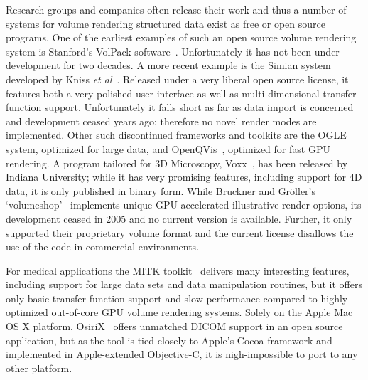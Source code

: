 Research groups and companies often release their work and thus a
number of systems for volume rendering structured data exist as free
or open source programs. One of the earliest examples of such an
open source volume rendering system is Stanford's VolPack
software~\cite{VolPack}.  Unfortunately it has not been under
development for two decades. A more recent example is the Simian system
developed
by Kniss \textit{et al}~\cite{Simian}. Released under a very liberal
open source license, it features both a very polished user interface as
well as multi-dimensional transfer function support. Unfortunately it
falls short as far as data import is concerned and development ceased
years ago; therefore no novel render modes are implemented. Other such
discontinued frameworks and toolkits are the OGLE~\cite{OGLE} system,
optimized for large data, and OpenQVis~\cite{OpenQVis}, optimized for fast GPU
rendering. A program tailored for 3D Microscopy,
Voxx~\cite{Indiana:2009:Voxx}, has been released by Indiana University;
while it has very promising features, including support for 4D data,
it is only published in binary form.  While Bruckner and Gr\"oller's
`volumeshop'~\cite{Bruckner:2005:VolumeShop} implements unique GPU
accelerated illustrative render options, its development ceased in 2005
and no current version is available. Further, it only supported their
proprietary volume format and the current license disallows the use of
the code in commercial environments.

For medical applications the MITK toolkit~\cite{Tian:2008:MITK}
delivers many interesting features, including support for large data
sets and data manipulation routines, but it offers only basic transfer
function support and slow performance compared to highly optimized
out-of-core GPU volume rendering systems. Solely on the Apple Mac
OS X platform, OsiriX~\cite{OsiriX} offers unmatched DICOM support in
an open source application, but as the tool is tied closely to Apple's
Cocoa framework and implemented in Apple-extended Objective-C, it is
nigh-impossible to port to any other platform.

